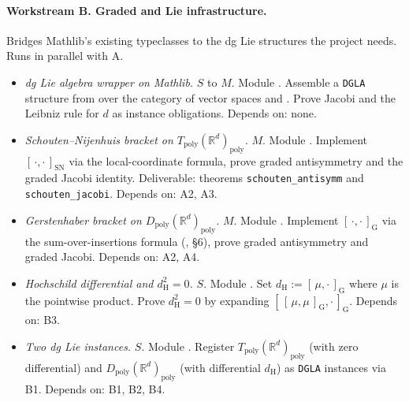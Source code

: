 \documentclass[11pt,a4paper]{article}
\theoremstyle{definition}
\newcommand{\R}{\mathbb{R}}
\newcommand{\Tpoly}{T_{\mathrm{poly}}}
\newcommand{\Dpoly}{D_{\mathrm{poly}}}
\newcommand{\Sch}[2]{[\,#1,#2\,]_{\mathrm{SN}}}
\newcommand{\Ger}[2]{[\,#1,#2\,]_{\mathrm{G}}}
\newcommand{\defi}[1]{\emph{#1}}
\begin{document}
\paragraph{Workstream B. Graded and Lie infrastructure.}
Bridges Mathlib's existing typeclasses to the dg Lie structures the
project needs. Runs in parallel with A.
\begin{itemize}[leftmargin=2em]
  \item[\textbf{B1}]
    \defi{dg Lie algebra wrapper on Mathlib.} $S$ to $M$. Module
    . Assemble a \texttt{DGLA}
    structure from 
    over the category of vector spaces and
    . Prove Jacobi and the Leibniz
    rule for $d$ as instance obligations. Depends on: none.
  \item[\textbf{B2}]
    \defi{Schouten--Nijenhuis bracket on
          $\Tpoly(\R^{d})_{\mathrm{poly}}$.} $M$. Module
    . Implement
    $\Sch{\cdot}{\cdot}$ via the local-coordinate formula, prove
    graded antisymmetry and the graded Jacobi identity. Deliverable:
    theorems \texttt{schouten\_antisymm} and \texttt{schouten\_jacobi}.
    Depends on: A2, A3.
  \item[\textbf{B3}]
    \defi{Gerstenhaber bracket on
          $\Dpoly(\R^{d})_{\mathrm{poly}}$.} $M$. Module
    . Implement
    $\Ger{\cdot}{\cdot}$ via the sum-over-insertions formula
    (\cite{Gerstenhaber1963}, \S6), prove graded antisymmetry and
    graded Jacobi. Depends on: A2, A4.
  \item[\textbf{B4}]
    \defi{Hochschild differential and $d_{\mathrm{H}}^{2}=0$.} $S$.
    Module . Set
    $d_{\mathrm{H}} := \Ger{\mu}{\cdot}$ where $\mu$ is the pointwise
    product. Prove $d_{\mathrm{H}}^{2} = 0$ by expanding
    $\Ger{\Ger{\mu}{\mu}}{\cdot}$. Depends on: B3.
  \item[\textbf{B5}]
    \defi{Two dg Lie instances.} $S$. Module
    . Register
    $\Tpoly(\R^{d})_{\mathrm{poly}}$ (with zero differential) and
    $\Dpoly(\R^{d})_{\mathrm{poly}}$ (with differential
    $d_{\mathrm{H}}$) as \texttt{DGLA} instances via B1. Depends on:
    B1, B2, B4.
\end{itemize}
\end{document}
